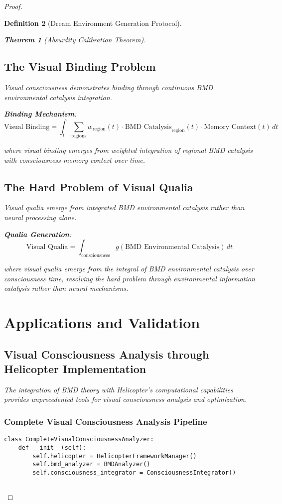 \documentclass[12pt,a4paper]{article}
\newtheorem{theorem}{Theorem}[section]
\newtheorem{definition}[theorem]{Definition}
\begin{document}
\begin{proof}
\begin{definition}[Dream Environment Generation Protocol]
\begin{theorem}[Absurdity Calibration Theorem]
\subsection{The Visual Binding Problem}

Visual consciousness demonstrates binding through continuous BMD environmental catalysis integration.

\textbf{Binding Mechanism}:
$$\text{Visual Binding} = \int_t \sum_{\text{regions}} w_{\text{region}}(t) \cdot \text{BMD Catalysis}_{\text{region}}(t) \cdot \text{Memory Context}(t) \, dt$$

where visual binding emerges from weighted integration of regional BMD catalysis with consciousness memory context over time.

\subsection{The Hard Problem of Visual Qualia}

Visual qualia emerge from integrated BMD environmental catalysis rather than neural processing alone.

\textbf{Qualia Generation}:
$$\text{Visual Qualia} = \int_{\text{consciousness}} g(\text{BMD Environmental Catalysis}) \, dt$$

where visual qualia emerge from the integral of BMD environmental catalysis over consciousness time, resolving the hard problem through environmental information catalysis rather than neural mechanisms.

\section{Applications and Validation}

\subsection{Visual Consciousness Analysis through Helicopter Implementation}

The integration of BMD theory with Helicopter's computational capabilities provides unprecedented tools for visual consciousness analysis and optimization.

\subsubsection{Complete Visual Consciousness Analysis Pipeline}

\begin{lstlisting}[style=pythonstyle, caption=Complete Visual Consciousness Analysis]
class CompleteVisualConsciousnessAnalyzer:
    def __init__(self):
        self.helicopter = HelicopterFrameworkManager()
        self.bmd_analyzer = BMDAnalyzer()
        self.consciousness_integrator = ConsciousnessIntegrator()
        

\end{lstlisting}
\end{theorem}
\end{definition}
\end{proof}
\end{document}
